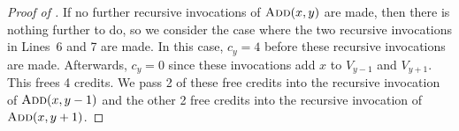\documentclass[kpfonts]{patmorin}
\begin{document}
\begin{proof}[Proof of ]
  If no further recursive invocations of $\textsc{Add}(x,y)$ are made, then there is nothing further to do, so we consider the case where the two recursive invocations in Lines~6 and 7 are made.  In this case, $c_y=4$ before these recursive invocations are made.  Afterwards, $c_y=0$ since these invocations add $x$ to $V_{y-1}$ and $V_{y+1}$.  This frees 4 credits.  We pass 2 of these free credits into the recursive invocation of $\textsc{Add}(x,y-1)$ and the other 2 free credits into the recursive invocation of $\textsc{Add}(x,y+1)$.
\end{proof}
\end{document}
